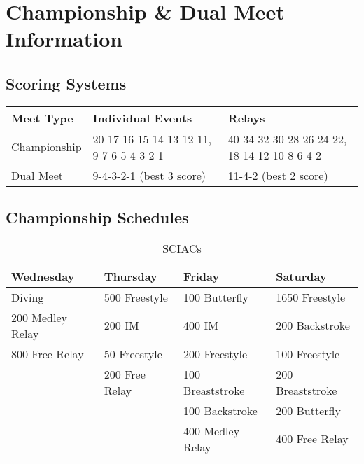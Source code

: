 
\section{Championship \& Dual Meet Information}


\subsection{Scoring Systems}

\begin{table}[H]
\centering
\small
\begin{tabular}{|p{3.5cm}|p{4cm}|p{4cm}|}
\hline
\rowcolor{teamprimary!20}
\textbf{Meet Type} & \textbf{Individual Events} & \textbf{Relays} \\
\hline
\rowcolor{teamprimary!5}
Championship & 20-17-16-15-14-13-12-11, 9-7-6-5-4-3-2-1 & 40-34-32-30-28-26-24-22, 18-14-12-10-8-6-4-2 \\
\hline
\rowcolor{teamprimary!5}
Dual Meet & 9-4-3-2-1 (best 3 score) & 11-4-2 (best 2 score) \\
\hline
\end{tabular}
\end{table}


\subsection{Championship Schedules}

\begin{table}[H]
\centering
\caption*{SCIACs}
\small
\begin{tabular}{p{2.8cm} p{2.8cm} p{2.8cm} p{3.2cm}}
\toprule
\rowcolor{teamprimary!20}
\textbf{Wednesday} & \textbf{Thursday} & \textbf{Friday} & \textbf{Saturday} \\
\midrule
Diving & 500 Freestyle & 100 Butterfly & 1650 Freestyle \\
\rowcolor{teamprimary!5}
200 Medley Relay & 200 IM & 400 IM & 200 Backstroke \\
800 Free Relay & 50 Freestyle & 200 Freestyle & 100 Freestyle \\
\rowcolor{teamprimary!5}
 & 200 Free Relay & 100 Breaststroke & 200 Breaststroke \\
 &  & 100 Backstroke & 200 Butterfly \\
\rowcolor{teamprimary!5}
 &  & 400 Medley Relay & 400 Free Relay \\
\bottomrule
\end{tabular}
\end{table}

